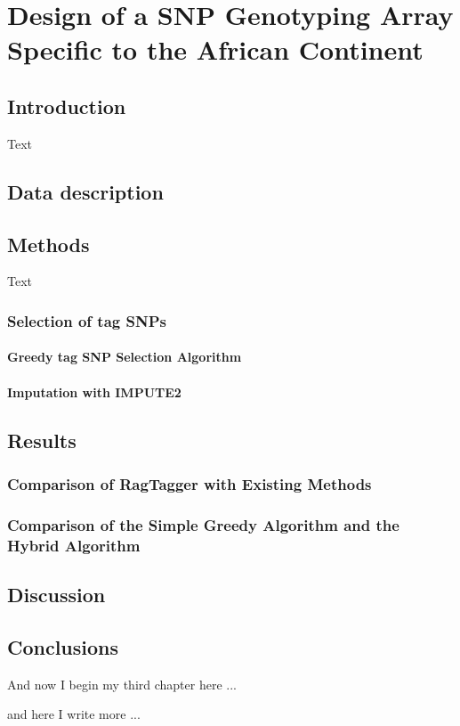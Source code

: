 \chapter{Design of a SNP Genotyping Array Specific to the African Continent}
\ifpdf
    \graphicspath{{Chapter3/Chapter3Figs/PNG/}{Chapter3/Chapter3Figs/PDF/}{Chapter3/Chapter3Figs/}}
\else
    \graphicspath{{Chapter3/Chapter3Figs/EPS/}{Chapter3/Chapter3Figs/}}
\fi

\section{Introduction}
Text
\section{Data description}
\section{Methods}
Text
\subsection{Selection of tag SNPs}
\subsubsection{Greedy tag SNP Selection Algorithm}
\subsubsection{Imputation with IMPUTE2}
\section{Results}
\subsection{Comparison of RagTagger with Existing Methods}
\subsection{Comparison of the Simple Greedy Algorithm and the Hybrid Algorithm}
\section{Discussion}
\section{Conclusions}

And now I begin my third chapter here ...

and here I write more ...



